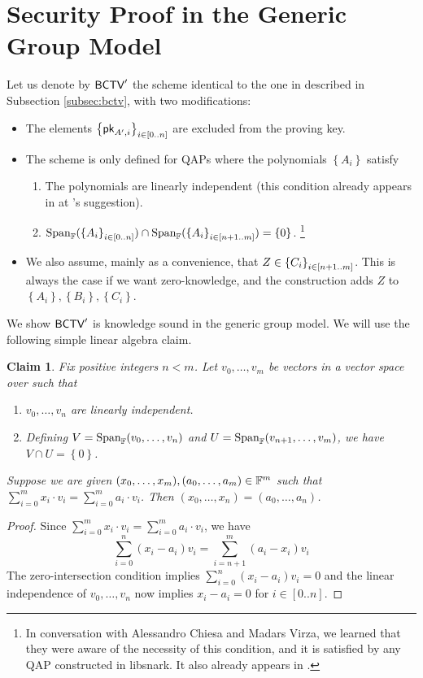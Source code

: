 \documentclass[11pt]{article}
\numberwithin{figure}{section} %
\newtheorem{claim}[thm]{Claim}
\newcommand{\set}[1]{\ensuremath{\left\{#1\right\}}\xspace}
\begin{document}
 \renewcommand{\span}[1]{\ensuremath{\mathrm{Span}_{\F}(#1)}\xspace}
 \newcommand{\bctvprime}{\ensuremath{\bctv'}\xspace}
\section{Security Proof in the Generic Group Model}\label{sec:ggmproof}
Let us denote by \bctvprime the scheme identical to the one in \cite{BCTV} described in Subsection \ref{subsec:bctv},
with two modifications:
\begin{itemize}
 \item The elements $\sett{\pk_{A',i}}{i\in [0..n]}$ are excluded from the proving key.
 \item The scheme is only defined for QAPs where the polynomials \set{A_i} satisfy
   \begin{enumerate}
    \item The polynomials  are linearly independent (this condition already appears in \cite{BCTV} at \cite{Parno15}'s suggestion).
    \item $\span{\sett{A_i}{i\in[0..n]}}\cap \span{\sett{A_i}{i\in [n+1..m]}}=\set{0}$. \footnote{In conversation with Alessandro Chiesa and Madars Virza, we  learned that they were aware of the necessity of this condition, and it is satisfied by any QAP constructed in libsnark\cite{libsnark}. It also already appears in \cite{BGG}.}
   \end{enumerate}
 \item We also assume, mainly as a convenience, that $Z\in \sett{C_i}{i\in [n+1..m]}$. This is always the case if we want zero-knowledge, and the \bctv construction adds $Z$ to $\set{A_i},\set{B_i},\set{C_i}$.
\end{itemize}

We show \bctvprime is knowledge sound in the generic group model.
We will use the following simple linear algebra claim.
\begin{claim}\label{clm:independence}
 Fix positive integers $n<m$. Let $v_0,\ldots,v_m$ be vectors in a vector space over \F such that
 \begin{enumerate}
  \item $v_0,\ldots,v_n$ are linearly independent.
  \item Defining $V = \span{v_0,\ldots,v_n}$ and $U=\span{v_{n+1},\ldots,v_m}$, we have $V\cap U =\set{0}$.
 \end{enumerate}
Suppose we are given $(x_0,\ldots,x_m),(a_0,\ldots,a_m)\in \mathbb F^m$ such that $\sum_{i=0}^m x_i\cdot v_i = \sum_{i=0}^m a_i\cdot v_i$.
Then $(x_0,\ldots,x_n) = (a_0,\ldots,a_n)$.
\end{claim}
\begin{proof}
 Since $\sum_{i=0}^m x_i\cdot v_i = \sum_{i=0}^m a_i\cdot v_i$,
 we have
 \[\sum_{i=0}^n (x_i-a_i) v_i = \sum_{i=n+1}^m (a_i-x_i)v_i\]
 The zero-intersection condition implies $\sum_{i=0}^n (x_i-a_i) v_i=0 $
 and the linear independence of $v_0,\ldots,v_n$ now implies
 $x_i-a_i=0$ for $i\in [0..n]$.
 
\end{proof}
\end{document}
